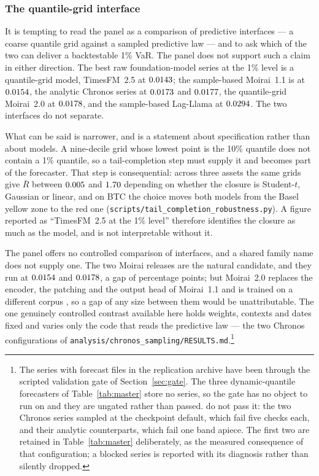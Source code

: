 \documentclass[preprint,11pt,authoryear]{elsarticle}
\newcommand{\1}{\boldsymbol{1}}
\begin{document}
\subsubsection{The quantile-grid interface}
\label{sec:interface_failure}

It is tempting to read the panel as a comparison of predictive interfaces --- a
coarse quantile grid against a sampled predictive law --- and to ask which of the
two can deliver a backtestable 1\% VaR. The panel does not support such a claim
in either direction.
The best raw foundation-model series at the 1\% level is a quantile-grid model,
TimesFM~2.5 at $0.0143$; the sample-based Moirai~1.1 is at
$0.0154$, the analytic Chronos series at $0.0173$ and
$0.0177$, the quantile-grid Moirai~2.0 at $0.0178$, and
the sample-based Lag-Llama at $0.0294$. The two interfaces do not
separate.

What can be said is narrower, and is a statement about specification rather than
about models. A nine-decile grid whose lowest point is the 10\% quantile does
not contain a 1\% quantile, so a tail-completion step must supply it and becomes
part of the forecaster. That step is consequential: across three assets the same
grids give $\bar R$ between $0.005$ and $1.70$ depending on whether the closure is
Student-$t$, Gaussian or linear, and on BTC the choice moves both models from
the Basel yellow zone to the red one (\texttt{scripts/tail\_completion\_robustness.py}). A figure reported as
``TimesFM~2.5 at the 1\% level'' therefore identifies the closure as much as the
model, and is not interpretable without it.

The panel offers no controlled comparison of interfaces, and a shared family
name does not supply one. The two Moirai releases are the natural candidate, and
they run at $0.0154$ and $0.0178$, a gap of
\nLitMoiraiGapPP{} percentage points; but Moirai~2.0 replaces the encoder, the
patching and the output head of Moirai~1.1 and is trained on a different corpus
\citep{woo2024moirai,liu2025moirai}, so a gap of any size between them would be
unattributable. The one genuinely controlled contrast available here holds
weights, contexts and dates fixed and varies only the code that reads the
predictive law --- the two Chronos configurations of
\texttt{analysis/chronos\_sampling/RESULTS.md}.\footnote{The \nGateSeries{}
series with forecast files in the replication archive have been through the
scripted validation gate of Section~\ref{sec:gate}. The three dynamic-quantile
forecasters of Table~\ref{tab:master} store no series, so the gate has no object
to run on and they are ungated rather than passed. \nGateBlocked{} do not pass
it: the two Chronos series sampled at the checkpoint default, which fail five
checks each, and their analytic counterparts, which fail one band apiece. The
first two are retained in Table~\ref{tab:master} deliberately, as the measured
consequence of that configuration; a blocked series is reported with its
diagnosis rather than silently dropped.}
\end{document}
